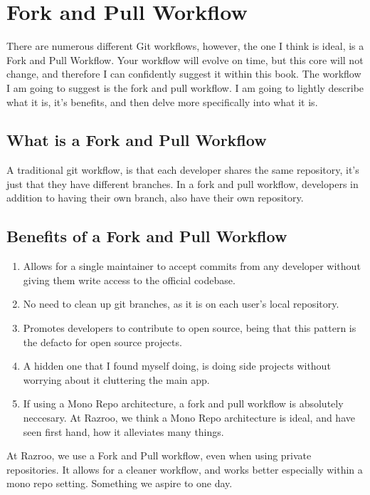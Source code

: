 \section { Fork and Pull Workflow }
There are numerous different Git workflows, however, the one I think is ideal, is a Fork and Pull Workflow. Your workflow will evolve on time, but this core will not change, and therefore I can confidently suggest it within this book. The workflow I am going to suggest is the fork and pull workflow. I am going to lightly describe what it is, it's benefits, and then delve more specifically into what it is.

\subsection{What is a Fork and Pull Workflow}
A traditional git workflow, is that each developer shares the same repository, it's just that they have different branches. In a fork and pull workflow, developers in addition to having their own branch, also have their own repository.

\subsection{Benefits of a Fork and Pull Workflow}
\begin{enumerate}
  \item Allows for a single maintainer to accept commits from any developer without giving them write access to the official codebase. 
  \item No need to clean up git branches, as it is on each user's local repository.
  \item Promotes developers to contribute to open source, being that this pattern is the defacto for open source projects. 
  \item A hidden one that I found myself doing, is doing side projects without worrying about it cluttering the main app.
  \item If using a Mono Repo architecture, a fork and pull workflow is absolutely neccesary. At Razroo, we think a Mono Repo architecture is ideal, and have seen first hand, how it alleviates many things. 
\end{enumerate}

At Razroo, we use a Fork and Pull workflow, even when using private repositories. It allows for a cleaner workflow, and works better especially within a mono repo setting. Something we aspire to one day. 

